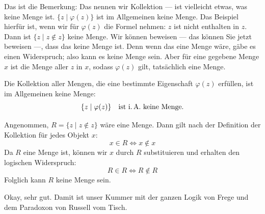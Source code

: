 \begin{spoken-clean}[00:30:51 - 00:32:45]
Das ist die Bemerkung: Das nennen wir Kollektion ---  ist vielleicht etwas, was keine Menge ist. $\{ z \mid \varphi(z) \}$ ist im Allgemeinen keine Menge. Das Beispiel hierfür ist, wenn wir für $\varphi(z)$ die Formel nehmen: $z$ ist nicht enthalten in $z$. Dann ist $\{ z \mid z \notin z \}$ keine Menge. Wir können beweisen --- das können Sie jetzt beweisen ---, dass das keine Menge ist. Denn wenn das eine Menge wäre, gäbe es einen Widerspruch; also kann es keine Menge sein. Aber für eine gegebene Menge $x$ ist die Menge aller $z$ in $x$, sodass $\varphi(z)$ gilt, tatsächlich eine Menge.
\end{spoken-clean}

\begin{math-stroke}
\begin{remark}
Die Kollektion aller Mengen, die eine bestimmte Eigenschaft $\varphi(z)$ erfüllen, ist im Allgemeinen keine Menge:
\[
\{ z \mid \varphi(z) \} \quad \text{ist i.\,A.\ keine Menge.}
\]
\end{remark}


\begin{short-proof}
Angenommen, $R = \{ z \mid z \notin z \}$ wäre eine Menge. Dann gilt nach der Definition der Kollektion für jedes Objekt $x$:
\[
x \in R \iff x \notin x
\]
Da $R$ eine Menge ist, können wir $x$ durch $R$ substituieren und erhalten den logischen Widerspruch:
\[
R \in R \iff R \notin R
\]
Folglich kann $R$ keine Menge sein.
\end{short-proof}
\end{math-stroke}

\begin{spoken-clean}[00:32:45 - 00:33:09]
Okay, sehr gut. Damit ist unser Kummer mit der ganzen Logik von Frege und dem Paradoxon von Russell vom Tisch.
\end{spoken-clean}

